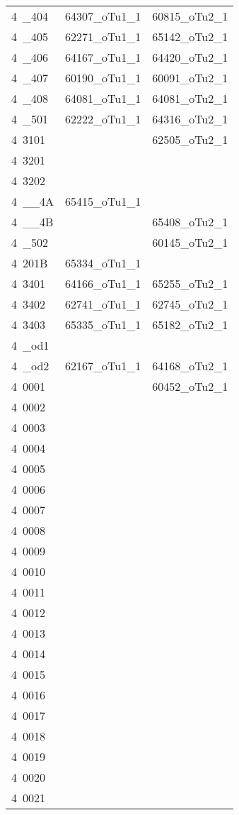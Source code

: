 \begin{table}[htbp]
\begin{center}
{\begin{tabular}{lcc}
   4~\_404 & 64307\_oTu1\_1 & 60815\_oTu2\_1 \\
   4~\_405 & 62271\_oTu1\_1 & 65142\_oTu2\_1 \\
   4~\_406 & 64167\_oTu1\_1 & 64420\_oTu2\_1 \\
   4~\_407 & 60190\_oTu1\_1 & 60091\_oTu2\_1 \\
   4~\_408 & 64081\_oTu1\_1 & 64081\_oTu2\_1 \\
   4~\_501 & 62222\_oTu1\_1 & 64316\_oTu2\_1 \\
   4~3101 &   & 62505\_oTu2\_1 \\
   4~3201 &   &   \\
   4~3202 &   &   \\
   4~\_\_4A & 65415\_oTu1\_1 &   \\
   4~\_\_4B &   & 65408\_oTu2\_1 \\
   4~\_502 &   & 60145\_oTu2\_1 \\
   4~201B & 65334\_oTu1\_1 &   \\
   4~3401 & 64166\_oTu1\_1 & 65255\_oTu2\_1 \\
   4~3402 & 62741\_oTu1\_1 & 62745\_oTu2\_1 \\
   4~3403 & 65335\_oTu1\_1 & 65182\_oTu2\_1 \\
   4~\_od1 &   &   \\
   4~\_od2 & 62167\_oTu1\_1 & 64168\_oTu2\_1 \\
   4~0001 &   & 60452\_oTu2\_1 \\
   4~0002 &   &   \\
   4~0003 &   &   \\
   4~0004 &   &   \\
   4~0005 &   &   \\
   4~0006 &   &   \\
   4~0007 &   &   \\
   4~0008 &   &   \\
   4~0009 &   &   \\
   4~0010 &   &   \\
   4~0011 &   &   \\
   4~0012 &   &   \\
   4~0013 &   &   \\
   4~0014 &   &   \\
   4~0015 &   &   \\
   4~0016 &   &   \\
   4~0017 &   &   \\
   4~0018 &   &   \\
   4~0019 &   &   \\
   4~0020 &   &   \\
   4~0021 &   &   \\
   \hline
  \end{tabular}
  }
 \end{center}
\end{table}
